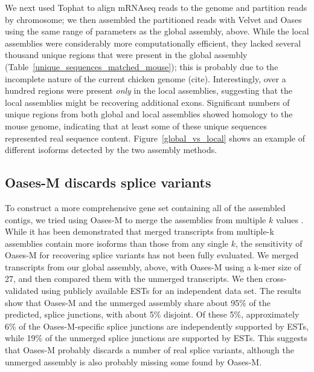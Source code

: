 \documentclass[10pt]{article}
\begin{document}
We next used Tophat to align mRNAseq reads to the genome and partition
reads by chromosome; we then assembled the partitioned reads with
Velvet and Oases using the same range of parameters as the global
assembly, above.  While the local assemblies were considerably more
computationally efficient, they lacked several thousand unique regions
that were present in the global assembly
(Table~\ref{unique_sequences_matched_mouse}); this is probably due to
the incomplete nature of the current chicken genome (cite).
Interestingly, over a hundred regions were present {\em only} in the
local assemblies, suggesting that the local assemblies might be
recovering additional exons.  Significant numbers of unique regions
from both global and local assemblies showed homology to the mouse
genome, indicating that at least some of these unique sequences
represented real sequence content.  Figure~\ref{global_vs_local} shows
an example of different isoforms detected by the two assembly methods.


\subsection*{Oases-M discards splice variants}

To construct a more comprehensive gene set containing all of the
assembled contigs, we tried using Oases-M to merge the assemblies from
multiple $k$ values \cite{Schulz:2012je}.  While it has been
demonstrated that merged transcripts from multiple-k assemblies
contain more isoforms than those from any single $k$, the sensitivity
of Oases-M for recovering splice variants has not been fully
evaluated.  We merged transcripts from our global assembly, above,
with Oases-M using a k-mer size of 27, and then compared them with the
unmerged transcripts.  We then cross-validated using publicly
available ESTs for an independent data set.  The results show that
Oases-M and the unmerged assembly share about 95\% of the predicted,
splice junctions, with about 5\% disjoint.  Of these 5\%,
approximately 6\% of the Oases-M-specific splice junctions are
independently supported by ESTs, while 19\% of the unmerged splice
junctions are supported by ESTs.  This suggests that Oases-M probably
discards a number of real splice variants, although the unmerged
assembly is also probably missing some found by Oases-M.
\end{document}
